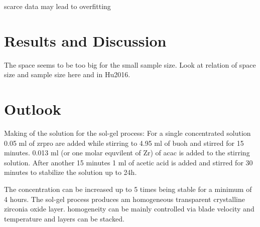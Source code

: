 \documentclass[a4paper]{article}
\begin{document}
scarce data may lead to overfitting\cite{Lecun1995conv}
\section{Results and Discussion}
The space seems to be too big for the small sample size.
Look at relation of space size and sample size here and in Hu2016.
\section{Outlook}

Making of the solution for the sol-gel process:
For a single concentrated solution 0.05 ml of \gls{zrpro} are added while stirring to 4.95 ml of \gls{buoh} and stirred for 15 minutes. 
0.013 ml (or one molar equvilent of Zr) of \gls{acac} is added to the stirring solution. 
After another 15 minutes 1 ml of acetic acid is added and stirred for 30 minutes to stabilize the solution up to 24h. 

The concentration can be increased up to 5 times being stable for a minimum of 4 hours. 
The sol-gel process produces am homogeneous transparent crystalline zirconia oxide layer. 
homogeneity can be mainly controlled via blade velocity and temperature and layers can be stacked.



\end{document}
